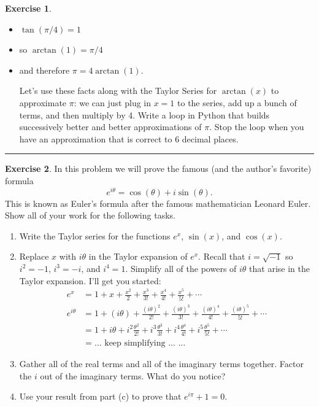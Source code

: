 \documentclass[
]{book}
\theoremstyle{definition}
\theoremstyle{definition}
\theoremstyle{definition}
\newtheorem{exercise}{Exercise}[chapter]
\theoremstyle{remark}
\begin{document}
\begin{exercise}
\begin{itemize}
\item
  \(\tan(\pi/4) = 1\)
\item
  so \(\arctan(1) = \pi/4\)
\item
  and therefore \(\pi = 4\arctan(1)\).

  Let's use these facts along with the Taylor Series for \(\arctan(x)\) to approximate \(\pi\): we can just plug in \(x=1\) to the series, add up a bunch of terms, and then multiply by 4. Write a loop in Python that builds successively better and better approximations of \(\pi\). Stop the loop when you have an approximation that is correct to 6 decimal places.
\end{itemize}
\end{exercise}

\begin{center}\rule{0.5\linewidth}{0.5pt}\end{center}

\begin{exercise}
\protect\hypertarget{exr:unnamed-chunk-68}{}{\label{exr:unnamed-chunk-68} }In this problem we will prove the famous (and the author's favorite)
formula \[e^{i\theta} = \cos(\theta) + i \sin(\theta).\] This is known
as Euler's formula after the famous mathematician Leonard Euler. Show
all of your work for the following tasks.

\begin{enumerate}
\def\labelenumi{\alph{enumi}.}
\item
  Write the Taylor series for the functions \(e^x\), \(\sin(x)\), and
  \(\cos(x)\).
\item
  Replace \(x\) with \(i\theta\) in the Taylor expansion of \(e^x\). Recall
  that \(i = \sqrt{-1}\) so \(i^2 = -1\), \(i^3 = -i\), and \(i^4 = 1\).
  Simplify all of the powers of \(i\theta\) that arise in the Taylor
  expansion. I'll get you started:
  \[\begin{aligned}
    e^x &= 1 + x + \frac{x^2}{2} + \frac{x^3}{3!} + \frac{x^4}{4!} + \frac{x^5}{5!} + \cdots \\
    e^{i\theta} &= 1 + (i\theta) + \frac{(i\theta)^2}{2!} + \frac{(i\theta)^3}{3!} + \frac{(i\theta)^4}{4!} + \frac{(i\theta)^5}{5!} + \cdots \\
    &= 1 + i\theta + i^2 \frac{\theta^2}{2!} + i^3 \frac{\theta^3}{3!} + i^4 \frac{\theta^4}{4!} + i^5 \frac{\theta^5}{5!} + \cdots \\
    &= \ldots \text{ keep simplifying ... } \ldots
  \end{aligned}\]
\item
  Gather all of the real terms and all of the imaginary terms
  together. Factor the \(i\) out of the imaginary terms. What do you
  notice?
\item
  Use your result from part (c) to prove that \(e^{i\pi} + 1 = 0\).
\end{enumerate}
\end{exercise}
\end{document}
